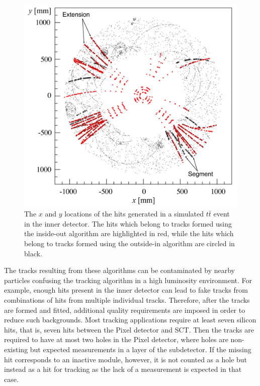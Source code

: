 \begin{figure}
\includegraphics[width=\fullfig]{figures/track_patterns.png}
\caption{The $x$ and $y$ locations of the hits generated in a simulated $t\bar{t}$ event in the inner detector. The hits which belong to tracks formed using the inside-out algorithm are highlighted in red, while the hits which belong to tracks formed using the outside-in algorithm are circled in black.}
\label{fig:track_patterns}
\end{figure}

The tracks resulting from these algorithms can be contaminated by nearby particles confusing the tracking algorithm in a high luminosity environment.
For example, enough hits present in the inner detector can lead to fake tracks from combinations of hits from multiple individual tracks.
Therefore, after the tracks are formed and fitted, additional quality requirements are imposed in order to reduce such backgrounds.
Most tracking applications require at least seven silicon hits, that is, seven hits between the Pixel detector and \ac{SCT}.
Then the tracks are required to have at most two holes in the Pixel detector, where holes are non-existing but expected measurements in a layer of the subdetector.
If the missing hit corresponds to an inactive module, however, it is not counted as a hole but instead as a hit for tracking as the lack of a measurement is expected in that case.

